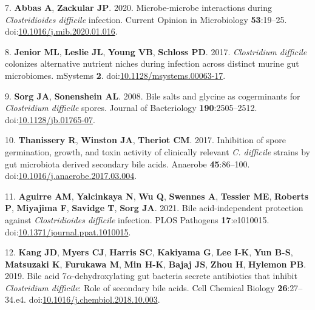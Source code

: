\documentclass[
  12pt,
]{article}
\newenvironment{cslreferences}%
  {}%
  {\par}
\begin{document}
\begin{cslreferences}
\leavevmode\hypertarget{ref-Abbas2020}{}%
7. \textbf{Abbas A}, \textbf{Zackular JP}. 2020. Microbe-microbe
interactions during \emph{Clostridioides difficile} infection. Current
Opinion in Microbiology \textbf{53}:19--25.
doi:\href{https://doi.org/10.1016/j.mib.2020.01.016}{10.1016/j.mib.2020.01.016}.

\leavevmode\hypertarget{ref-Jenior2017}{}%
8. \textbf{Jenior ML}, \textbf{Leslie JL}, \textbf{Young VB},
\textbf{Schloss PD}. 2017. \emph{Clostridium difficile} colonizes
alternative nutrient niches during infection across distinct murine gut
microbiomes. mSystems \textbf{2}.
doi:\href{https://doi.org/10.1128/msystems.00063-17}{10.1128/msystems.00063-17}.

\leavevmode\hypertarget{ref-Sorg2008}{}%
9. \textbf{Sorg JA}, \textbf{Sonenshein AL}. 2008. Bile salts and
glycine as cogerminants for \emph{Clostridium difficile} spores. Journal
of Bacteriology \textbf{190}:2505--2512.
doi:\href{https://doi.org/10.1128/jb.01765-07}{10.1128/jb.01765-07}.

\leavevmode\hypertarget{ref-Thanissery2017}{}%
10. \textbf{Thanissery R}, \textbf{Winston JA}, \textbf{Theriot CM}.
2017. Inhibition of spore germination, growth, and toxin activity of
clinically relevant \emph{C. difficile} strains by gut microbiota
derived secondary bile acids. Anaerobe \textbf{45}:86--100.
doi:\href{https://doi.org/10.1016/j.anaerobe.2017.03.004}{10.1016/j.anaerobe.2017.03.004}.

\leavevmode\hypertarget{ref-Aguirre2021}{}%
11. \textbf{Aguirre AM}, \textbf{Yalcinkaya N}, \textbf{Wu Q},
\textbf{Swennes A}, \textbf{Tessier ME}, \textbf{Roberts P},
\textbf{Miyajima F}, \textbf{Savidge T}, \textbf{Sorg JA}. 2021. Bile
acid-independent protection against \emph{Clostridioides difficile}
infection. PLOS Pathogens \textbf{17}:e1010015.
doi:\href{https://doi.org/10.1371/journal.ppat.1010015}{10.1371/journal.ppat.1010015}.

\leavevmode\hypertarget{ref-Kang2019}{}%
12. \textbf{Kang JD}, \textbf{Myers CJ}, \textbf{Harris SC},
\textbf{Kakiyama G}, \textbf{Lee I-K}, \textbf{Yun B-S},
\textbf{Matsuzaki K}, \textbf{Furukawa M}, \textbf{Min H-K},
\textbf{Bajaj JS}, \textbf{Zhou H}, \textbf{Hylemon PB}. 2019. Bile acid
7\(\alpha\)-dehydroxylating gut bacteria secrete antibiotics that
inhibit \emph{Clostridium difficile}: Role of secondary bile acids. Cell
Chemical Biology \textbf{26}:27--34.e4.
doi:\href{https://doi.org/10.1016/j.chembiol.2018.10.003}{10.1016/j.chembiol.2018.10.003}.


\end{cslreferences}
\end{document}
